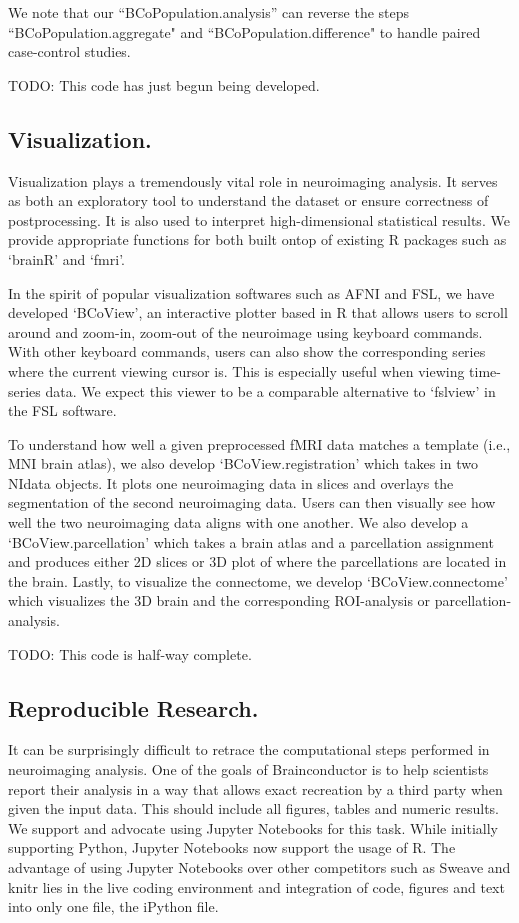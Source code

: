 \documentclass{nature}
\begin{document}
We note that our ``BCoPopulation.analysis'' can reverse the steps
``BCoPopulation.aggregate"
and ``BCoPopulation.difference" to handle paired case-control studies.

{\color{red}TODO: This code has just begun being developed.}

\subsection{Visualization.}
Visualization plays a tremendously vital role in neuroimaging analysis.
It serves as both an exploratory tool to understand the dataset or ensure
correctness
of postprocessing. It is also used to interpret high-dimensional statistical
results.
We provide appropriate functions for both built ontop of existing R packages
such
as `brainR' and `fmri'.

In the spirit of popular visualization softwares such as AFNI and FSL, we have
developed `BCoView', an interactive plotter based in R that allows users to
scroll around and
zoom-in, zoom-out of the neuroimage using keyboard commands. With other keyboard
commands, users can also show the corresponding series where the current
viewing
cursor is. This is especially useful when viewing time-series data. 
We expect this viewer to be a comparable alternative to `fslview' in
the FSL
software.

To understand how well a given preprocessed fMRI data matches a template (i.e.,
MNI brain
atlas), we also develop `BCoView.registration' which takes in two NIdata
objects.
It plots one neuroimaging data in slices and overlays the segmentation of the
second
neuroimaging data. Users can then visually see how well the two neuroimaging
data aligns
with one another. We also develop a `BCoView.parcellation' which takes a brain
atlas and
a parcellation assignment and produces either 2D slices or 3D plot of where the
parcellations
are located in the brain.
Lastly, to visualize the connectome, we develop `BCoView.connectome' which
visualizes the
3D brain and the corresponding ROI-analysis or parcellation-analysis.

{\color{red}TODO: This code is half-way complete.}

\subsection{Reproducible Research.}

It can be surprisingly difficult to retrace the computational steps performed
in neuroimaging analysis. One of the goals of Brainconductor is to help
scientists report their analysis in a way that allows exact recreation by
a third party when given the input data. This should include all figures,
tables and numeric results. We support and advocate using Jupyter Notebooks for
this task. While initially supporting Python, Jupyter Notebooks now support
the usage of R. The advantage of using Jupyter Notebooks over other competitors
such as Sweave and knitr lies in the live coding environment and
integration of code, figures and text into only one file, the iPython file.
\end{document}
